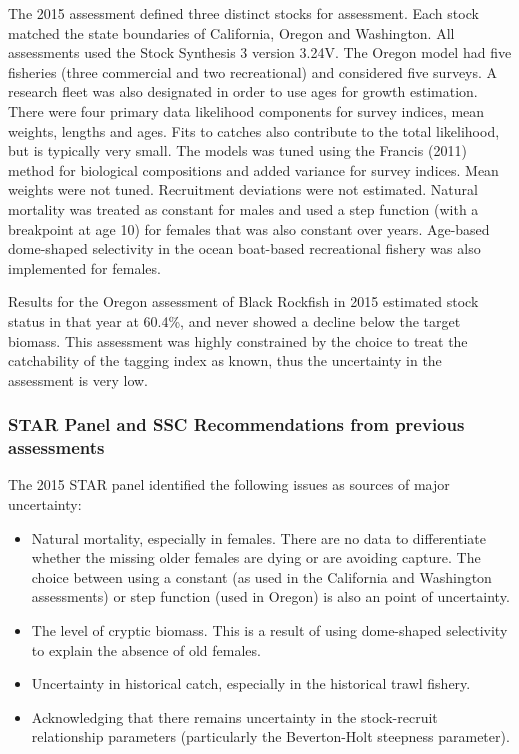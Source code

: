 \documentclass[11pt,
  english,
  letterpaper,
]{article}
\providecommand{\tightlist}{%
  \setlength{\itemsep}{0pt}\setlength{\parskip}{0pt}}
\providecommand{\tightlist}{%
  \setlength{\itemsep}{0pt}\setlength{\parskip}{0pt}}
\begin{document}
The 2015 assessment defined three distinct stocks for assessment. Each stock matched the state boundaries of California, Oregon and Washington. All assessments used the Stock Synthesis 3 version 3.24V. The Oregon model had five fisheries (three commercial and two recreational) and considered five surveys. A research fleet was also designated in order to use ages for growth estimation. There were four primary data likelihood components for survey indices, mean weights, lengths and ages. Fits to catches also contribute to the total likelihood, but is typically very small. The models was tuned using the Francis (2011) method for biological compositions and added variance for survey indices. Mean weights were not tuned. Recruitment deviations were not estimated. Natural mortality was treated as constant for males and used a step function (with a breakpoint at age 10) for females that was also constant over years. Age-based dome-shaped selectivity in the ocean boat-based recreational fishery was also implemented for females.

Results for the Oregon assessment of Black Rockfish in 2015 estimated stock status in that year at 60.4\%, and never showed a decline below the target biomass. This assessment was highly constrained by the choice to treat the catchability of the tagging index as known, thus the uncertainty in the assessment is very low.

\hypertarget{star-panel-and-ssc-recommendations-from-previous-assessments}{%
\subsubsection{STAR Panel and SSC Recommendations from previous assessments}\label{star-panel-and-ssc-recommendations-from-previous-assessments}}

The 2015 STAR panel identified the following issues as sources of major uncertainty:

\begin{itemize}
\tightlist
\item
  Natural mortality, especially in females. There are no data to differentiate whether the missing older females are dying or are avoiding capture. The choice between using a constant (as used in the California and Washington assessments) or step function (used in Oregon) is also an point of uncertainty.
\item
  The level of cryptic biomass. This is a result of using dome-shaped selectivity to explain the absence of old females.
\item
  Uncertainty in historical catch, especially in the historical trawl fishery.
\item
  Acknowledging that there remains uncertainty in the stock-recruit relationship parameters (particularly the Beverton-Holt steepness parameter).
\end{itemize}
\end{document}
